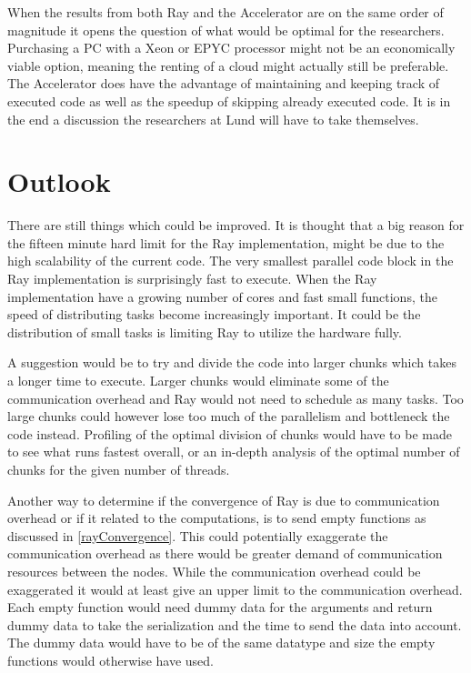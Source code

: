 \documentclass[12pt, a4paper]{article}
\begin{document}
When the results from both Ray and the Accelerator are on the same order of magnitude it opens the question of what would be optimal for the researchers.
Purchasing a PC with a Xeon or EPYC processor might not be an economically viable option, meaning the renting of a cloud might actually still be preferable.
The Accelerator does have the advantage of maintaining and keeping track of executed code as well as the speedup of skipping already executed code.
It is in the end a discussion the researchers at Lund will have to take themselves.


\section{Outlook}

There are still things which could be improved.
It is thought that a big reason for the fifteen minute hard limit for the Ray implementation, might be due to the high scalability of the current code.
The very smallest parallel code block in the Ray implementation is surprisingly fast to execute.
When the Ray implementation have a growing number of cores and fast small functions, the speed of distributing tasks become increasingly important.
It could be the distribution of small tasks is limiting Ray to utilize the hardware fully.

A suggestion would be to try and divide the code into larger chunks which takes a longer time to execute.
Larger chunks would eliminate some of the communication overhead and Ray would not need to schedule as many tasks.
Too large chunks could however lose too much of the parallelism and bottleneck the code instead.
Profiling of the optimal division of chunks would have to be made to see what runs fastest overall, or an in-depth analysis of the optimal number of chunks for the given number of threads.

Another way to determine if the convergence of Ray is due to communication overhead or if it related to the computations, is to send empty functions as discussed in \cref{rayConvergence}.
This could potentially exaggerate the communication overhead as there would be greater demand of communication resources between the nodes.
While the communication overhead could be exaggerated it would at least give an upper limit to the communication overhead.
Each empty function would need dummy data for the arguments and return dummy data to take the serialization and the time to send the data into account.
The dummy data would have to be of the same datatype and size the empty functions would otherwise have used.
\end{document}
